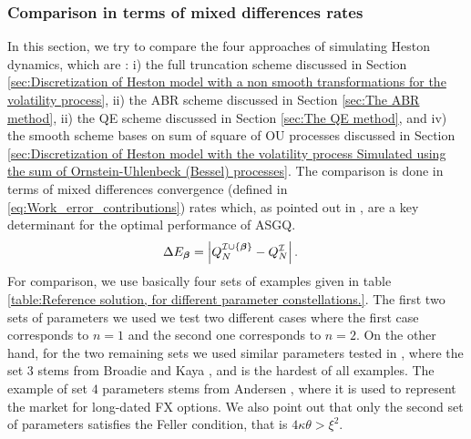 \subsubsection{Comparison in terms of mixed differences rates}
In this section, we try to compare  the four  approaches of simulating Heston dynamics, which are : i) the full truncation scheme discussed in Section \ref{sec:Discretization of Heston model with a non smooth transformations for the volatility process},  ii) the ABR scheme discussed in Section \ref{sec:The ABR method},  ii) the QE scheme discussed in Section \ref{sec:The QE method}, and iv) the smooth scheme bases on sum of square of OU processes discussed in Section \ref{sec:Discretization of Heston model with the volatility process Simulated using the sum of  Ornstein-Uhlenbeck (Bessel) processes}. The comparison is done in terms of mixed differences convergence (defined in \eqref{eq:Work_error_contributions}) rates  which, as pointed out in \cite{haji2016multi}, are a key determinant for the optimal performance of ASGQ.
\begin{align}\label{eq:Work_error_contributions}
\Delta E_{\boldsymbol{\beta}} &= \left\lvert Q^{\mathcal{I} \cup \{\boldsymbol{\beta}\}}_N-Q^{\mathcal{I}}_N\right\rvert.
\end{align}
For comparison, we use basically four sets of examples  given in table \ref{table:Reference solution, for different parameter constellations.}. The first two sets of parameters we used we test two different cases where the first case corresponds to $n=1$ and the second one corresponds to $n=2$. On the other hand, for the two remaining sets we used similar parameters tested in \cite{lord2010comparison}, where the set $3$  stems from Broadie and Kaya \cite{broadie2006exact}, and is the hardest of all examples. The example of set $4$ parameters  stems from Andersen \cite{andersen2007efficient}, where it is used to represent the market for long-dated FX options.  We also point out that only the second set of parameters  satisfies the Feller condition, that is $4 \kappa \theta > \xi^2$.

